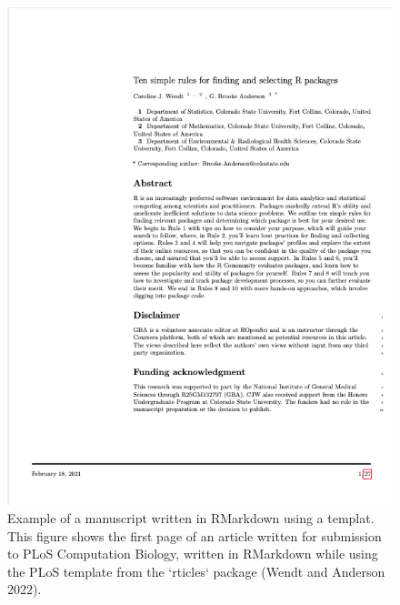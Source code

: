 \documentclass[]{tufte-book}
\begin{document}
\begin{figure}
\includegraphics[width=\textwidth]{figures/rticles_example} \caption[Example of a manuscript written in RMarkdown using a templat]{Example of a manuscript written in RMarkdown using a templat. This figure shows the first page of an article written for submission to PLoS Computation Biology, written in RMarkdown while using the PLoS template from the `rticles` package (Wendt and Anderson 2022).}\label{fig:rticleexample}
\end{figure}
\end{document}

